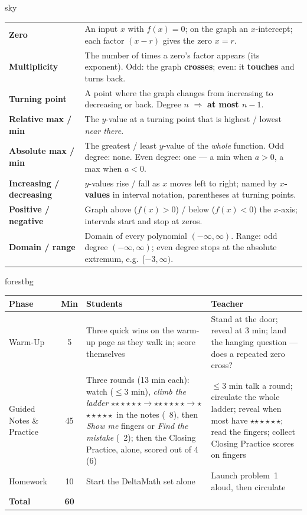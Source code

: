 \documentclass[10pt]{article}
\newcommand{\MeetingLength}{60 minutes}
\newcommand{\rung}[1]{{\color{goldacc}\ifcase#1\or$\star$\or$\star\star$\or$\star\star\star$\fi}}
\begin{document}
\begin{skillbox}{sky}
\renewcommand{\arraystretch}{1.25}
\begin{tabularx}{\linewidth}{@{}>{\bfseries}l X@{}}
Zero & An input $x$ with $f(x)=0$; on the graph an $x$-intercept; each factor $(x-r)$ gives the zero $x=r$. \\
Multiplicity & The number of times a zero's factor appears (its exponent). Odd: the graph \textbf{crosses}; even: it \textbf{touches} and turns back. \\
Turning point & A point where the graph changes from increasing to decreasing or back. Degree $n$ $\Rightarrow$ \textbf{at most $n-1$}. \\
Relative max / min & The $y$-value at a turning point that is highest / lowest \emph{near there}. \\
Absolute max / min & The greatest / least $y$-value of the \emph{whole} function. Odd degree: none. Even degree: one --- a min when $a>0$, a max when $a<0$. \\
Increasing / decreasing & $y$-values rise / fall as $x$ moves left to right; named by \textbf{$x$-values} in interval notation, parentheses at turning points. \\
Positive / negative & Graph above ($f(x)>0$) / below ($f(x)<0$) the $x$-axis; intervals start and stop at zeros. \\
Domain / range & Domain of every polynomial $(-\infty,\infty)$. Range: odd degree $(-\infty,\infty)$; even degree stops at the absolute extremum, e.g.\ $[-3,\infty)$. \\
\end{tabularx}
\end{skillbox}

\begin{fixedskillbox}[Lesson at a Glance --- \MeetingLength]{forestbg}
\renewcommand{\arraystretch}{1.25}
\begin{tabularx}{\linewidth}{@{}l c X X@{}}
\textbf{Phase} & \textbf{Min} & \textbf{Students} & \textbf{Teacher} \\
\hline
Warm-Up & 5 & Three quick wins on the warm-up page as they walk in; score themselves & Stand at the door; reveal at 3 min; land the hanging question --- does a repeated zero cross? \\
Guided Notes \& Practice & 45 & Three rounds (13 min each): watch ($\le$3 min), \emph{climb the ladder} \rung1$\to$\rung2$\to$\rung3\ in the notes (~8), then \emph{Show me} fingers or \emph{Find the mistake} (~2); then the Closing Practice, alone, scored out of 4 (6) & $\le$3 min talk a round; circulate the whole ladder; reveal when most have \rung2; read the fingers; collect Closing Practice scores on fingers \\
Homework & 10 & Start the DeltaMath set alone & Launch problem~1 aloud, then circulate \\
\hline
\textbf{Total} & \textbf{60} & & \\
\end{tabularx}
\end{fixedskillbox}
\end{document}
